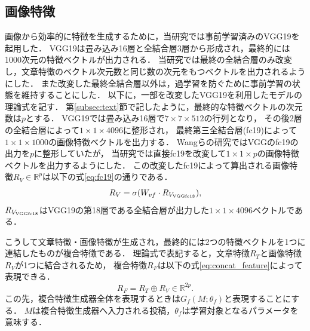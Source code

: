 \subsection{画像特徴}
画像から効率的に特徴を生成するために，当研究では事前学習済みのVGG19\cite{DBLP:journals/corr/SimonyanZ14a}を起用した．
VGG19は畳み込み16層と全結合層3層から形成され，最終的には1000次元の特徴ベクトルが出力される．
当研究では最終の全結合層のみ改変し，文章特徴のベクトル次元数と同じ数の次元をもつベクトルを出力されるようにした．
また改変した最終全結合層以外は，過学習を防ぐために事前学習の状態を維持することにした．
以下に，一部を改変したVGG19を利用したモデルの理論式を記す．
第\ref{subsec:text}節で記したように，最終的な特徴ベクトルの次元数は$p$とする．
VGG19では畳み込み16層で$7 \times 7 \times 512$の行列となり，
その後2層の全結合層によって$1 \times 1 \times 4096$に整形され，
最終第三全結合層(fc19)によって$1 \times 1 \times 1000$の画像特徴ベクトルを出力する．
Wangらの研究\cite{Wang:2018:EEA:3219819.3219903}ではVGGのfc19の出力を$p$に整形していたが，
当研究では直接fc19を改変して$1 \times 1 \times p$の画像特徴ベクトルを出力するようにした．
この改変したfc19によって算出される画像特徴$R_V \in \mathbb{R}^p$は以下の式\ref{eq:fc19}の通りである．
\begin{equation}
    \label{eq:fc19}
    R_V = \sigma(W_{vf} \cdot R_{V_{\rm VGGfc18}}),
\end{equation}
$R_{V_{\rm VGGfc18}}$はVGG19の第18層である全結合層が出力した$1 \times 1 \times 4096$ベクトルである．

こうして文章特徴・画像特徴が生成され，最終的には2つの特徴ベクトルを1つに連結したものが複合特徴である．
理論式で表記すると，文章特徴$R_T$と画像特徴$R_V$が1つに結合されるため，
複合特徴$R_F$は以下の式\ref{eq:concat_feature}によって表現できる．
\begin{equation}
    \label{eq:concat_feature}
    R_F = R_T \oplus R_V \in \mathbb{R}^{2p}.
\end{equation}
この先，複合特徴生成器全体を表現するときは$G_f(M; \theta_f)$と表現することにする．
$M$は複合特徴生成器へ入力される投稿，$\theta_f$は学習対象となるパラメータを意味する．
%
